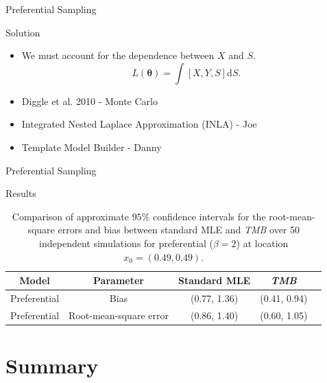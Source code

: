 \documentclass{beamer}
\begin{document}
\begin{frame}{Preferential Sampling}
\begin{block}{Solution}
\begin{itemize}
\item We must account for the dependence between $X$ and $S$.
\begin{equation}
L(\boldsymbol{\theta})=\int \left[X,Y,S\right]\mathrm{d}S.
\end{equation}
\item Diggle et al. 2010 - Monte Carlo 
\item Integrated Nested Laplace Approximation (INLA) - Joe
\item Template Model Builder - Danny
\end{itemize}
\end{block}
\end{frame}

\begin{frame}{Preferential Sampling}
\begin{block}{Results}
\small
\begin{table}[ht]
\centering
    \begin{tabular}{| c | c | c | c | c |}
    \hline
    Model & Parameter  & Standard MLE & {\it TMB} \\ \hline
    Preferential & Bias & (0.77, 1.36)  & (0.41, 0.94) \\
    Preferential & Root-mean-square error & (0.86, 1.40) & (0.60, 1.05)  \\ \hline
\end{tabular}
    \caption {Comparison of approximate $95\%$ confidence intervals for the root-mean-square errors and bias between standard MLE and {\it TMB} over 50 independent simulations for preferential ($\beta=2$) at location $x_0=(0.49, 0.49)$.}
 \label{table:simtable}
\end{table}
\normalsize
\end{block}

\end{frame}
\section*{Summary}
\end{document}
